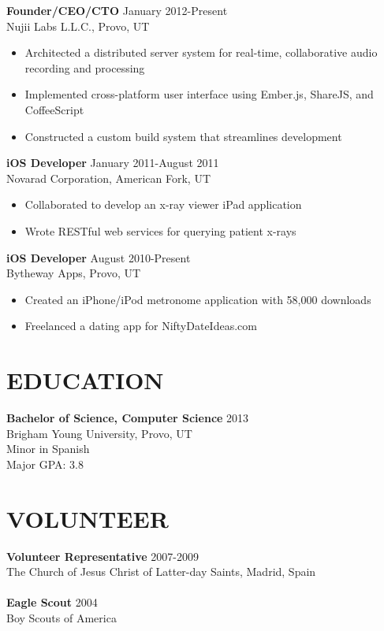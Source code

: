 \documentclass[margin]{res}
\begin{document}
\begin{resume}
      {\bf Founder/CEO/CTO} \hfill January 2012-Present \\
      Nujii Labs L.L.C., Provo, UT 
      \begin{itemize} \itemsep -2pt
        \item Architected a distributed server system for real-time, 
        collaborative audio recording and processing
        \item Implemented cross-platform user interface using Ember.js, ShareJS,
        and CoffeeScript
        \item Constructed a custom build system that streamlines development
      \end{itemize}

      {\bf iOS Developer} \hfill January 2011-August 2011 \\
      Novarad Corporation, American Fork, UT  
      \begin{itemize} \itemsep -2pt
        \item Collaborated to develop an x-ray viewer iPad application
        \item Wrote RESTful web services for querying patient x-rays
      \end{itemize}

      {\bf iOS Developer} \hfill  August 2010-Present \\
      Bytheway Apps, Provo, UT
      \begin{itemize} \itemsep -2pt
        \item Created an iPhone/iPod metronome application with 58,000 downloads
        \item Freelanced a dating app for NiftyDateIdeas.com
      \end{itemize}

    \section{EDUCATION}
      {\bf Bachelor of Science, Computer Science} \hfill 2013 \\
      Brigham Young University, Provo, UT                 \\
      Minor in Spanish                                    \\
      Major GPA: 3.8

    \section{VOLUNTEER}
      {\bf Volunteer Representative} \hfill 2007-2009 \\
      The Church of Jesus Christ of Latter-day Saints, Madrid, Spain \\ \\
      {\bf Eagle Scout} \hfill 2004 \\
      Boy Scouts of America


\end{resume}
\end{document}

